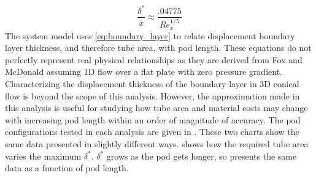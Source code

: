 \begin{equation}
	\label{eq:boundary_layer}
	\frac{\delta^{*}}{x} \approx  \frac{.04775}{Re_{x}^{1/5}}
\end{equation}
The system model uses \cref{eq:boundary_layer} to relate displacement boundary layer thickness,
and therefore tube area, with pod length. These equations
do not perfectly represent real physical relationships as they are derived from
Fox and McDonald assuming 1D flow over a
flat plate with zero pressure gradient. Characterizing the displacement
thickness of the boundary layer in 3D conical flow is beyond the scope of this analysis.
However, the approximation made in this analysis is useful for studying how
tube area and material costs may change with increasing pod length within an
order of magnitude of accuracy.  The pod configurations tested in each analysis are given in
. These two charts show the same data presented in
slightly different ways. 
shows how the required tube area varies the maximum $\delta^*$. $\delta^*$
grows as the pod gets longer, so  presents the
same data as a function of pod length. %


